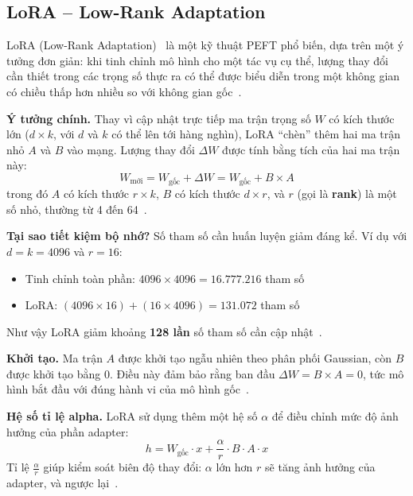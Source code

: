 \subsection{LoRA -- Low-Rank Adaptation}

LoRA (Low-Rank Adaptation)~\cite{hu2022lora} là một kỹ thuật PEFT phổ biến, dựa trên một ý tưởng đơn giản: khi tinh chỉnh mô hình cho một tác vụ cụ thể, lượng thay đổi cần thiết trong các trọng số thực ra có thể được biểu diễn trong một không gian có chiều thấp hơn nhiều so với không gian gốc~\cite{towardsdatascience_lora}.

\textbf{Ý tưởng chính.} Thay vì cập nhật trực tiếp ma trận trọng số $W$ có kích thước lớn ($d \times k$, với $d$ và $k$ có thể lên tới hàng nghìn), LoRA ``chèn'' thêm hai ma trận nhỏ $A$ và $B$ vào mạng. Lượng thay đổi $\Delta W$ được tính bằng tích của hai ma trận này:
\begin{equation}
W_{\text{mới}} = W_{\text{gốc}} + \Delta W = W_{\text{gốc}} + B \times A
\end{equation}
trong đó $A$ có kích thước $r \times k$, $B$ có kích thước $d \times r$, và $r$ (gọi là \textbf{rank}) là một số nhỏ, thường từ 4 đến 64~\cite{hf_lora_conceptual}.

\textbf{Tại sao tiết kiệm bộ nhớ?} Số tham số cần huấn luyện giảm đáng kể. Ví dụ với $d = k = 4096$ và $r = 16$:
\begin{itemize}
    \item Tinh chỉnh toàn phần: $4096 \times 4096 = 16.777.216$ tham số
    \item LoRA: $(4096 \times 16) + (16 \times 4096) = 131.072$ tham số
\end{itemize}
Như vậy LoRA giảm khoảng \textbf{128 lần} số tham số cần cập nhật~\cite{lightning_lora}.

\textbf{Khởi tạo.} Ma trận $A$ được khởi tạo ngẫu nhiên theo phân phối Gaussian, còn $B$ được khởi tạo bằng 0. Điều này đảm bảo rằng ban đầu $\Delta W = B \times A = 0$, tức mô hình bắt đầu với đúng hành vi của mô hình gốc~\cite{towardsdatascience_lora}.

\textbf{Hệ số tỉ lệ alpha.} LoRA sử dụng thêm một hệ số $\alpha$ để điều chỉnh mức độ ảnh hưởng của phần adapter:
\begin{equation}
h = W_{\text{gốc}} \cdot x + \frac{\alpha}{r} \cdot B \cdot A \cdot x
\end{equation}
Tỉ lệ $\frac{\alpha}{r}$ giúp kiểm soát biên độ thay đổi: $\alpha$ lớn hơn $r$ sẽ tăng ảnh hưởng của adapter, và ngược lại~\cite{hf_lora_conceptual}.

